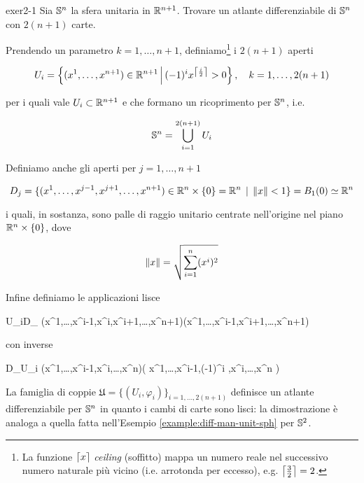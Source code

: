 
{exer2-1}
{
Sia $ \S^{n} $ la sfera unitaria in $ \R^{n+1} $. Trovare un atlante differenziabile di $ \S^{n} $ con $ 2(n+1) $ carte.
}
{
Prendendo un parametro $ k = 1,\dots,n+1 $, definiamo\footnote{%
	La funzione $ \ceil*{x} $ \textit{ceiling} (soffitto) mappa un numero reale nel successivo numero naturale più vicino (i.e. arrotonda per eccesso), e.g. $ \ceil*{\frac{3}{2}} = 2 $.%
} i $ 2(n+1) $ aperti

\begin{equation}
	U_{i} = \left\{ (x^{1},\dots,x^{n+1}) \in \R^{n+1} \st (-1)^{i} x^{\ceil*{\frac{i}{2}}} > 0 \right\} \qcomma k = 1, \dots, 2(n+1)
\end{equation}

per i quali vale $ U_{i} \subset \R^{n+1} $ e che formano un ricoprimento per $ \S^{n} $, i.e.

\begin{equation}
	\S^{n} = \bigcup_{i=1}^{2(n+1)} U_{i}
\end{equation}

Definiamo anche gli aperti per $ j = 1,\dots,n+1 $

\begin{equation}
	D_{j} = \{ (x^{1},\dots,x^{j-1},x^{j+1},\dots,x^{n+1}) \in \R^{n} \times \{0\} = \R^{n} \, \mid \, \norm{x} < 1 \} = B_{1}(0) \simeq \R^{n}
\end{equation}

i quali, in sostanza, sono palle di raggio unitario centrate nell'origine nel piano $ \R^{n} \times \{0\} $, dove

\begin{equation}
	\norm{x} = \sqrt{ \sum_{i=1}^{n} (x^{i})^{2} }
\end{equation}

Infine definiamo le applicazioni lisce

	{U_{i}}{D_{}}
	{(x^{1},\dots,x^{i-1},x^{i},x^{i+1},\dots,x^{n+1})}{(x^{1},\dots,x^{i-1},x^{i+1},\dots,x^{n+1})}

con inverse

	{D_{}}{U_{i}}
	{(x^{1},\dots,x^{i-1},x^{i},\dots,x^{n})}{\left( x^{1},\dots,x^{i-1},(-1)^{i} ,x^{i},\dots,x^{n} \right)}

La famiglia di coppie $ \mathfrak{U} = \{ (U_{i},\varphi_{i}) \}_{i=1,\dots,2(n+1)} $ definisce un atlante differenziabile per $ \S^{n} $ in quanto i cambi di carte sono lisci: la dimostrazione è analoga a quella fatta nell'Esempio \ref{example:diff-man-unit-sph} per $ \S^{2} $.
}

